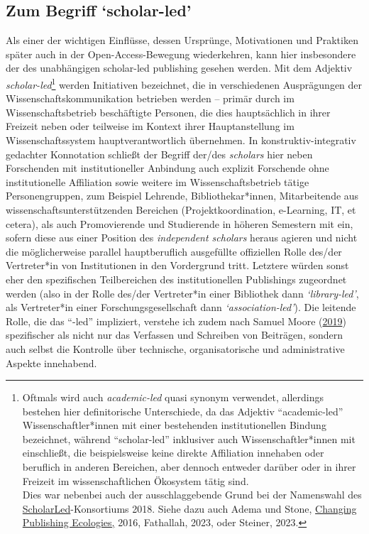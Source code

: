 \documentclass[a4paper,
fontsize=11pt,
oneside,
numbers=noperiodatend,
parskip=half-,
bibliography=totoc,
final
]{scrartcl}
\begin{document}
\hypertarget{zum-begriff-scholar-led}{%
\subsection{\texorpdfstring{Zum Begriff
\enquote*{scholar-led}}{Zum Begriff `scholar-led'}}\label{zum-begriff-scholar-led}}

Als einer der wichtigen Einflüsse, dessen Ursprünge, Motivationen und
Praktiken später auch in der Open-Access-Bewegung wiederkehren, kann
hier insbesondere der des unabhängigen scholar-led publishing gesehen
werden. Mit dem Adjektiv \emph{scholar-led}\footnote{Oftmals wird auch
  \emph{academic-led} quasi synonym verwendet, allerdings bestehen hier
  definitorische Unterschiede, da das Adjektiv \enquote{academic-led}
  Wissenschaftler*innen mit einer bestehenden institutionellen Bindung
  bezeichnet, während \enquote{scholar-led} inklusiver auch
  Wissenschaftler*innen mit einschließt, die beispielsweise keine
  direkte Affiliation innehaben oder beruflich in anderen Bereichen,
  aber dennoch entweder darüber oder in ihrer Freizeit im
  wissenschaftlichen Ökosystem tätig sind.\\
  Dies war nebenbei auch der ausschlaggebende Grund bei der Namenswahl
  des \href{https://scholarled.org}{ScholarLed}-Konsortiums 2018. Siehe
  dazu auch Adema und Stone,
  \href{https://repository.jisc.ac.uk/6666/1/Changing-publishing-ecologies-report.pdf}{Changing
  Publishing Ecologies,} 2016, Fathallah, 2023, oder Steiner, 2023.}
werden Initiativen bezeichnet, die in verschiedenen Ausprägungen der
Wissenschaftskommunikation betrieben werden -- primär durch im
Wissenschaftsbetrieb beschäftigte Personen, die dies hauptsächlich in
ihrer Freizeit neben oder teilweise im Kontext ihrer Hauptanstellung im
Wissenschaftssystem hauptverantwortlich übernehmen. In
konstruktiv-integrativ gedachter Konnotation schließt der Begriff
der/des \emph{scholars} hier neben Forschenden mit institutioneller
Anbindung auch explizit Forschende ohne institutionelle Affiliation
sowie weitere im Wissenschaftsbetrieb tätige Personengruppen, zum
Beispiel Lehrende, Bibliothekar*innen, Mitarbeitende aus
wissenschaftsunterstützenden Bereichen (Projektkoordination, e-Learning,
IT, et cetera), als auch Promovierende und Studierende in höheren
Semestern mit ein, sofern diese aus einer Position des \emph{independent
scholars} heraus agieren und nicht die möglicherweise parallel
hauptberuflich ausgefüllte offiziellen Rolle des/der Vertreter*in von
Institutionen in den Vordergrund tritt. Letztere würden sonst eher den
spezifischen Teilbereichen des institutionellen Publishings zugeordnet
werden (also in der Rolle des/der Vertreter*in einer Bibliothek dann
\emph{\enquote*{library-led}}, als Vertreter*in einer
Forschungsgesellschaft dann \emph{\enquote*{association-led}}). Die leitende
Rolle, die das \enquote{-led} impliziert, verstehe ich zudem nach Samuel
Moore
(\href{https://www.samuelmoore.org/2019/10/24/open-by-whom-on-the-meaning-of-scholar-led/}{2019})
spezifischer als nicht nur das Verfassen und Schreiben von Beiträgen,
sondern auch selbst die Kontrolle über technische, organisatorische und
administrative Aspekte innehabend.
\end{document}

